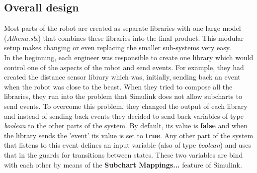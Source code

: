 \documentclass[a4paper,12pt]{article}
\begin{document}
\subsection{Overall design}
Most parts of the robot are created as separate libraries with one large model (\textit{Athena.slx}) that combines these libraries into the final product. This modular setup makes changing or even replacing the smaller sub-systems very easy.\\
In the beginning, each engineer was responsible to create one library which would control one of the aspects of the robot and send events. For example, they had created the distance sensor library which was, initially, sending back an event when the robot was close to the beast. When they tried to compose all the libraries, they run into the problem that Simulink does not allow subcharts to send events. To overcome this problem, they changed the output of each library and instead of sending back events they decided to send back variables of type \textit{boolean} to the other parts of the system. By default, its value is \textbf{false} and when the library sends the 'event' its value is set to \textbf{true}. Any other part of the system that listens to this event defines an input variable (also of type \textit{boolean}) and uses that in the guards for transitions between states. These two variables are bind with each other by means of the \textbf{Subchart Mappings...} feature of Simulink.



\end{document}
